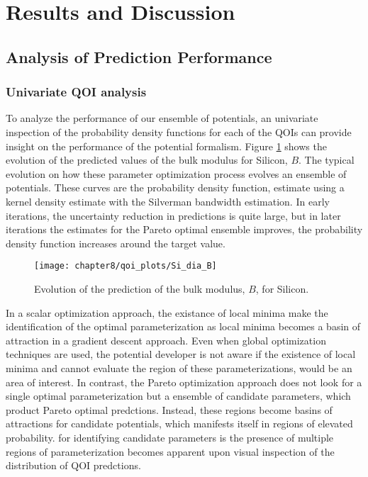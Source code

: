 \section{Results and Discussion}

\subsection{Analysis of Prediction Performance}
\subsubsection{Univariate QOI analysis}
To analyze the performance of our ensemble of potentials, an univariate inspection of the probability density functions for each of the QOIs can provide insight on the performance of the potential formalism.
Figure \ref{fig:Si_qoi_B} shows the evolution of the predicted values of the bulk modulus for Silicon, $B$.  The typical evolution on how these parameter optimization process evolves an ensemble of potentials.
These curves are the probability density function, estimate using a kernel density estimate with the Silverman bandwidth estimation.
In early iterations, the uncertainty reduction in predictions is quite large, but in later iterations the estimates for the Pareto optimal ensemble improves, the probability density function increases around the target value.

\begin{figure}[h]
	\centering
	\texttt{[image: chapter8/qoi\_plots/Si\_dia\_B]}
	\caption{Evolution of the prediction of the bulk modulus, $B$, for Silicon.}
	\label{fig:Si_qoi_B}
\end{figure}

In a scalar optimization approach, the existance of local minima make the identification of the optimal parameterization as local minima becomes a basin of attraction in a gradient descent approach.
Even when global optimization techniques are used, the potential developer is not aware if the existence of local minima and cannot evaluate the region of these parameterizations, would be an area of interest.
In contrast, the Pareto optimization approach does not look for a single optimal parameterization but a ensemble of candidate parameters, which product Pareto optimal predctions.
Instead, these regions become basins of attractions for candidate potentials, which manifests itself in regions of elevated probability.
for identifying candidate parameters is the presence of multiple regions of parameterization becomes apparent upon visual inspection of the distribution of QOI predctions.

